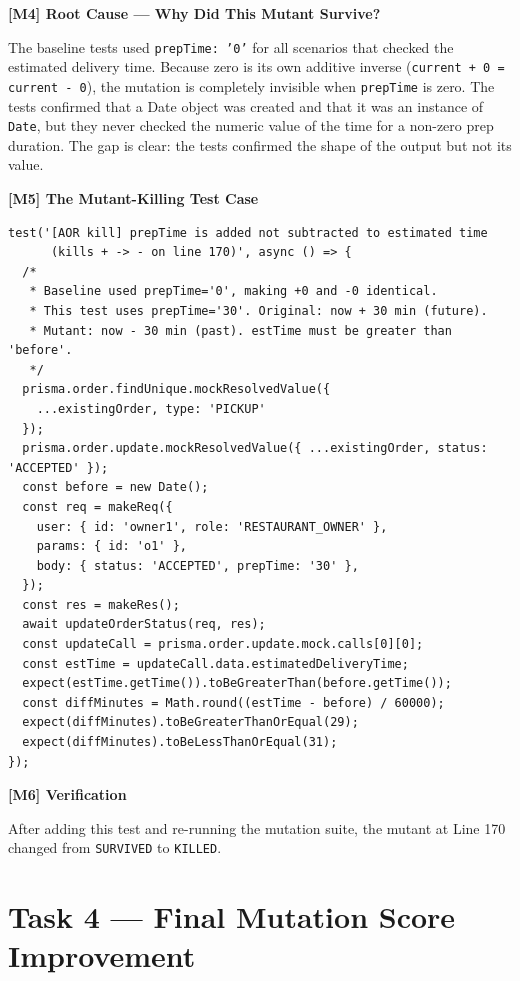 \documentclass[12pt, a4paper]{article}
\begin{document}
\textbf{[M4] Root Cause --- Why Did This Mutant Survive?}

The baseline tests used \texttt{prepTime: '0'} for all scenarios that checked the estimated delivery time. Because zero is its own additive inverse (\texttt{current + 0 = current - 0}), the mutation is completely invisible when \texttt{prepTime} is zero. The tests confirmed that a Date object was created and that it was an instance of \texttt{Date}, but they never checked the numeric value of the time for a non-zero prep duration. The gap is clear: the tests confirmed the shape of the output but not its value.

\textbf{[M5] The Mutant-Killing Test Case}

\begin{lstlisting}[caption={Test that kills Mutant 4}]
test('[AOR kill] prepTime is added not subtracted to estimated time
      (kills + -> - on line 170)', async () => {
  /*
   * Baseline used prepTime='0', making +0 and -0 identical.
   * This test uses prepTime='30'. Original: now + 30 min (future).
   * Mutant: now - 30 min (past). estTime must be greater than 'before'.
   */
  prisma.order.findUnique.mockResolvedValue({
    ...existingOrder, type: 'PICKUP'
  });
  prisma.order.update.mockResolvedValue({ ...existingOrder, status: 'ACCEPTED' });
  const before = new Date();
  const req = makeReq({
    user: { id: 'owner1', role: 'RESTAURANT_OWNER' },
    params: { id: 'o1' },
    body: { status: 'ACCEPTED', prepTime: '30' },
  });
  const res = makeRes();
  await updateOrderStatus(req, res);
  const updateCall = prisma.order.update.mock.calls[0][0];
  const estTime = updateCall.data.estimatedDeliveryTime;
  expect(estTime.getTime()).toBeGreaterThan(before.getTime());
  const diffMinutes = Math.round((estTime - before) / 60000);
  expect(diffMinutes).toBeGreaterThanOrEqual(29);
  expect(diffMinutes).toBeLessThanOrEqual(31);
});
\end{lstlisting}

\textbf{[M6] Verification}

After adding this test and re-running the mutation suite, the mutant at Line 170 changed from \texttt{SURVIVED} to \texttt{KILLED}.

\section{Task 4 --- Final Mutation Score Improvement}
\end{document}
